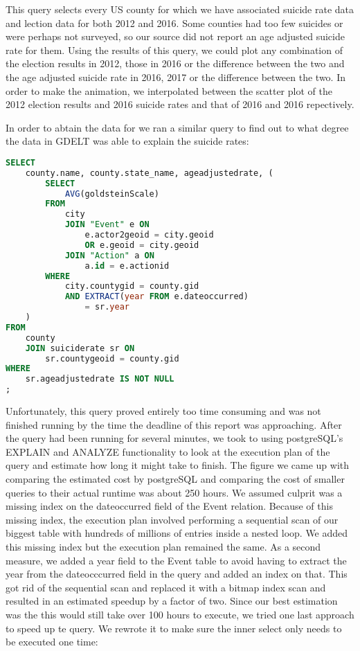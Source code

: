 This query selects every US county for which we have associated suicide rate data and lection data for both 2012 and 2016.
Some counties had too few suicides or were perhaps not surveyed, so our source did not report an age adjusted suicide rate for them.
Using the results of this query, we could plot any combination of the election results in 2012, those in 2016 or the difference between the two and the age adjusted suicide rate in 2016, 2017 or the difference between the two.
In order to make the animation, we interpolated between the scatter plot of the 2012 election results and 2016 suicide rates and that of 2016 and 2016 repectively.
\par
In order to abtain the data for  we ran a similar query to find out to what degree the data in GDELT was able to explain the suicide rates:

\begin{lstlisting}[language=SQL]
SELECT
    county.name, county.state_name, ageadjustedrate, (
        SELECT
            AVG(goldsteinScale)
        FROM
            city
            JOIN "Event" e ON 
                e.actor2geoid = city.geoid 
                OR e.geoid = city.geoid
            JOIN "Action" a ON 
                a.id = e.actionid
        WHERE
            city.countygid = county.gid 
            AND EXTRACT(year FROM e.dateoccurred) 
                = sr.year
    )
FROM
    county
    JOIN suiciderate sr ON 
        sr.countygeoid = county.gid
WHERE
    sr.ageadjustedrate IS NOT NULL
;
\end{lstlisting}

Unfortunately, this query proved entirely too time consuming and was not finished running by the time the deadline of this report was approaching.
After the query had been running for several minutes, we took to using postgreSQL's EXPLAIN and ANALYZE functionality to look at the execution plan of the query and estimate how long it might take to finish.
The figure we came up with comparing the estimated cost by postgreSQL and comparing the cost of smaller queries to their actual runtime was about 250 hours.
We assumed culprit was a missing index on the dateoccurred field of the Event relation.
Because of this missing index, the execution plan involved performing a sequential scan of our biggest table with hundreds of millions of entries inside a nested loop.
We added this missing index but the execution plan remained the same.
As a second measure, we added a year field to the Event table to avoid having to extract the year from the dateocccurred field in the query and added an index on that.
This got rid of the sequential scan and replaced it with a bitmap index scan and resulted in an estimated speedup by a factor of two.
Since our best estimation was the this would still take over 100 hours to execute, we tried one last approach to speed up te query.
We rewrote it to make sure the inner select only needs to be executed one time:

